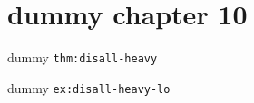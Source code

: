 \clearpage\begingroup\small
\setcounter{chapter}{10}\addtocounter{chapter}{-1}
\chapter{dummy chapter 10}
\begin{theorem}\label{thm:disall-heavy}dummy \texttt{thm:disall-heavy}\end{theorem}
\begin{example}\label{ex:disall-heavy-lo}dummy \texttt{ex:disall-heavy-lo}\end{example}
\endgroup
